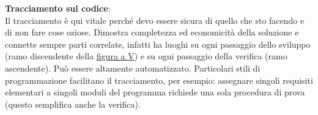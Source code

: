 		\textbf{Tracciamento sul codice}: \\ %
		Il tracciamento è qui vitale perché devo essere sicura di quello che sto facendo e di non fare cose oziose. Dimostra completezza ed economicità della soluzione e connette sempre parti correlate, infatti ha luoghi su ogni passaggio dello sviluppo (ramo discendente della \underline{\hyperref[V]{figura a V}}) e su ogni passaggio della verifica (ramo ascendente). Può essere altamente automatizzato.
		Particolari stili di programmazione facilitano il tracciamento, per esempio: assegnare singoli requisiti elementari a singoli moduli del programma richiede una sola procedura di prova (questo semplifica anche la verifica).
		
	
